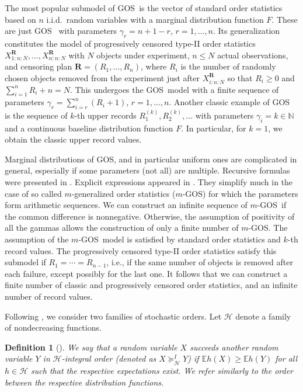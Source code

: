 \documentclass [11pt]{article}
\newtheorem{definition}{Definition}
\newcommand{\gos}{GOS}
\begin{document}
The most popular submodel of \gos\ is the vector of standard order statistics based on $n$ i.i.d.\ random variables with a marginal distribution function $F$. These are just \gos\ %
with parameters $\gamma_r= n+1-r$, $r=1,\ldots,n$. Its generalization constitutes the model of progressively censored type-II order statistics $X_{1:n:N}^{\mathbf{R}}, \ldots,X_{n:n:N}^{\mathbf{R}}$ with $N$ objects under experiment, $n \leq N$ actual observations,
and censoring plan $\mathbf{R}=(R_1, \ldots,R_n)$, where $R_i$ is the number of randomly chosen objects removed from the experiment just after $X_{i:n:N}^{\mathbf{R}}$  so that $R_i \geq 0$ and $\sum_{i=1}^n R_i +n =N$. This undergoes the \gos\ model with a finite sequence of parameters
$\gamma_r= \sum_{i=r}^n (R_i+1)$, $r=1,\ldots,n$.
Another classic example of \gos\ %
is the sequence of $k$-th upper records $R_1^{(k)}, R_2^{(k)}, \ldots$ with parameters $\gamma_i=k \in \mathbb{N}$ and a continuous baseline distribution function $F$. 
In particular, for $k=1$, we obtain the classic upper record values.

Marginal distributions of \gos, %
and in particular uniform ones are complicated in general, especially if some parameters (not all) are multiple.
Recursive formulas were presented in \cite{CramerKamps2003}. Explicit expressions appeared in \cite{Rychlik2026}. They simplify much in the case of so called
$m$-generalized order statistics ($m$-\gos) for which the parameters form arithmetic sequences.
We can construct an infinite sequence of $m$-\gos\ if the common  difference is nonnegative. Otherwise, the assumption of positivity of all the gammas allows the construction of only a finite number of $m$-\gos.
The assumption of the $m$-\gos\ model is  satisfied by standard order statistics and $k$-th record values.
The progressively censored type-II order statistics satisfy this submodel if $R_1= \cdots = R_{n-1}$, i.e., if the same number of objects is removed after each failure, except possibly for the last one.
It follows that we can construct a finite number of classic and progressively censored order statistics, and an infinite number of record values.






Following \cite{ALO-JAP}, we consider two families of stochastic orders. Let $\mathcal{H}$ denote a family of nondecreasing functions.
\begin{definition}[\cite{muller1997}]
We say that a random variable $X$ succeeds another random variable $Y$ in $\mathcal{H}$-integral order (denoted as $X \succeq_{\mathcal{H}}^I Y$) if
$\mathbb{E}h(X) \geq \mathbb{E}h(Y)$ for all $h \in \mathcal{H}$ such that the respective expectations exist.
We refer similarly to the order between the respective distribution functions.
\end{definition}
\end{document}
